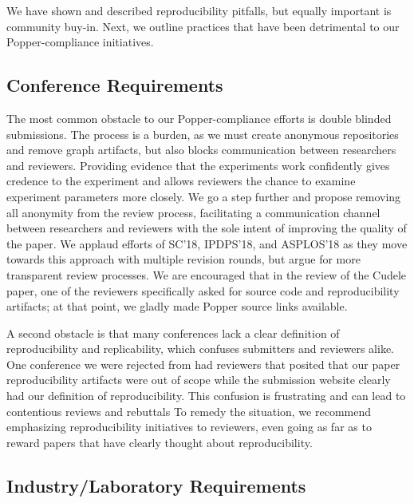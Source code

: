 We have shown and described reproducibility pitfalls, but equally important is
community buy-in. Next, we outline practices that have been detrimental to our
Popper-compliance initiatives.

\subsection{Conference Requirements}

The most common obstacle to our Popper-compliance efforts is double blinded
submissions. The process is a burden, as we must create anonymous repositories
and remove graph artifacts, but also blocks communication between researchers
and reviewers. Providing evidence that the experiments work confidently gives
credence to the experiment and allows reviewers the chance to examine
experiment parameters more closely. We go a step further and propose removing
all anonymity from the review process, facilitating a communication channel
between researchers and reviewers with the sole intent of improving the quality
of the paper. We applaud efforts of SC'18, IPDPS'18, and ASPLOS'18 as they move
towards this approach with multiple revision rounds, but argue for more
transparent review processes. We are encouraged that in the review of the
Cudele paper, one of the reviewers specifically asked for source code and
reproducibility artifacts; at that point, we gladly made Popper source links
available.

A second obstacle is that many conferences lack a clear definition of
reproducibility and replicability, which confuses submitters and reviewers
alike. One conference we were rejected from had reviewers that posited that our
paper reproducibility artifacts were out of scope while the submission website
clearly had our definition of reproducibility. This confusion is frustrating
and can lead to contentious reviews and rebuttals To remedy the situation, we
recommend emphasizing reproducibility initiatives to reviewers, even going as
far as to reward papers that have clearly thought about reproducibility.

\subsection{Industry/Laboratory Requirements}
\label{sec:reqs}

